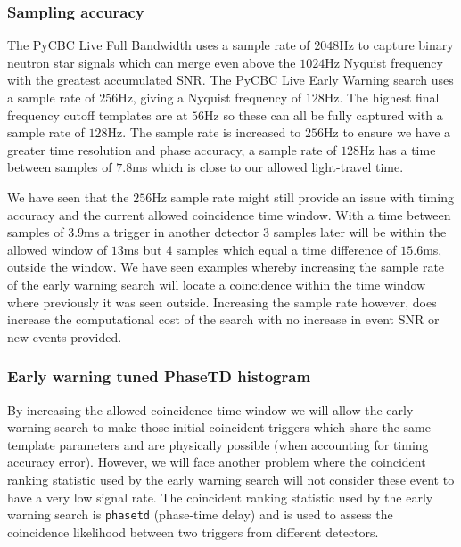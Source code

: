 \subsubsection{\label{}Sampling accuracy}

The PyCBC Live Full Bandwidth uses a sample rate of $2048$Hz to capture binary neutron star signals which can merge even above the $1024$Hz Nyquist frequency with the greatest accumulated SNR. The PyCBC Live Early Warning search uses a sample rate of $256$Hz, giving a Nyquist frequency of $128$Hz. The highest final frequency cutoff templates are at $56$Hz so these can all be fully captured with a sample rate of $128$Hz. The sample rate is increased to $256$Hz to ensure we have a greater time resolution and phase accuracy, a sample rate of $128$Hz has a time between samples of $7.8$ms which is close to our allowed light-travel time.

We have seen that the $256$Hz sample rate might still provide an issue with timing accuracy and the current allowed coincidence time window. With a time between samples of $3.9$ms a trigger in another detector $3$ samples later will be within the allowed window of $13$ms but $4$ samples which equal a time difference of $15.6$ms, outside the window. We have seen examples whereby increasing the sample rate of the early warning search will locate a coincidence within the time window where previously it was seen outside. Increasing the sample rate however, does increase the computational cost of the search with no increase in event SNR or new events provided.

\subsubsection{\label{}Early warning tuned PhaseTD histogram}

By increasing the allowed coincidence time window we will allow the early warning search to make those initial coincident triggers which share the same template parameters and are physically possible (when accounting for timing accuracy error). However, we will face another problem where the coincident ranking statistic used by the early warning search will not consider these event to have a very low signal rate. The coincident ranking statistic used by the early warning search is \verb|phasetd| (phase-time delay) and is used to assess the coincidence likelihood between two triggers from different detectors.

